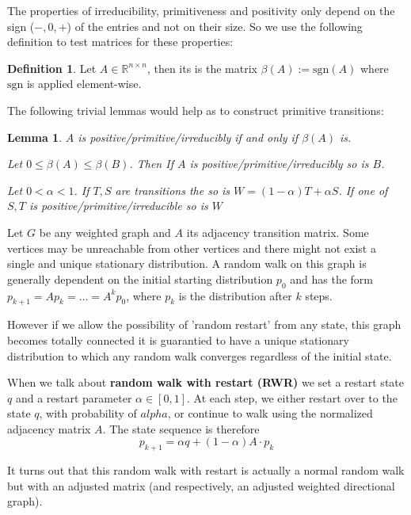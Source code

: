 \documentclass[a4paper,10pt]{article}
\newcommand{\R}{\mathbb{R}}
\newcommand{\lt}{<}
\theoremstyle{definition}
\newtheorem{mydef}{Definition}[section]
\theoremstyle{remark}
\theoremstyle{plain}
\newtheorem{lemma}{Lemma}[section]
\begin{document}
The properties of irreducibility, primitiveness and positivity only depend on the
sign ($-,0,+$) of the entries and not on their size. So we use the following definition to
test matrices for these properties:

\begin{mydef}
Let $A \in \R^{n \times n}$, then its  is the matrix
$\beta(A) := \text{sgn}(A)$ where $\text{sgn}$ is applied element-wise.
\end{mydef}

The following trivial lemmas would help as to construct primitive transitions:

\begin{lemma}
\label{lemma:SplusT}
$A$ is positive/primitive/irreducibly if
and only if $\beta(A)$ is.

Let $0 \leq \beta(A) \leq \beta(B)$.
Then If $A$ is positive/primitive/irreducibly so is $B$.

Let $0 \lt \alpha \lt 1$. If $T,S$ are transitions the so is $W=(1-\alpha)T +
\alpha S$.
If one of $S,T$ is positive/primitive/irreducible so is $W$
\end{lemma}

Let $G$ be any weighted graph and $A$ its adjacency transition matrix. Some vertices may
be unreachable from other vertices and there might not exist a single and
unique stationary distribution.
A random walk on this graph is generally
dependent on the initial starting distribution $p_0$ and has the
form $p_{k+1} = Ap_k = \dots = A^k p_0$, where $p_k$ is the
distribution after $k$ steps.

However if we allow the possibility of 'random restart' from any state, this
graph becomes totally connected it is guarantied to have a unique stationary
distribution to which any random walk converges regardless of the initial state.

When we talk about \textbf{random walk with restart (RWR)} we set a restart
state $q$ and a restart parameter $\alpha \in [0,1]$. At each step, we
either restart over to the state $q$, with probability of
$alpha$, or continue to walk using the normalized adjacency matrix
$A$. The state sequence is therefore
\begin{equation}
\label{eq:RWR}
p_{k+1} = \alpha q + (1 -
\alpha) A \cdot p_k
\end{equation}

It turns out that this random walk with restart is actually a normal
random walk but with an adjusted matrix (and respectively, an
adjusted weighted directional graph). 
\end{document}
